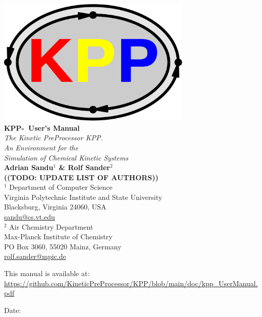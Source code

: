 \documentclass[twoside]{article}
\newcommand{\todo}[1]{{{\color{red}\uppercase{\bf ((TODO: #1))}}}}
\begin{document}
\thispagestyle{empty}
\vspace*{-2cm}
\begin{center}
  {\includegraphics[width=0.7\textwidth]{Figures/kpp-logo}}\\[9mm]
  {\Huge\bf KPP-\thiskppversion\ User's Manual}\\[9mm]
  {\huge\em The Kinetic PreProcessor KPP.}\\[5mm]
  {\huge\em An Environment for the}\\[3mm]
  {\huge\em Simulation of Chemical Kinetic Systems}\\[9mm]
  {\huge\bf Adrian Sandu$^1$ \& Rolf Sander$^2$\\[3mm]\todo{update list of authors}}\\[9mm]
  \Large
  $^1$ Department of Computer Science\\
  Virginia Polytechnic Institute and State University\\
  Blacksburg, Virginia 24060, USA\\
  \url{sandu@cs.vt.edu}\\[5mm]
  $^2$ Air Chemistry Department\\
  Max-Planck Institute of Chemistry\\
  PO Box 3060, 55020 Mainz, Germany\\
  \url{rolf.sander@mpic.de}

  \vfill

  {\large This manual is available at:
    \url{https://github.com/KineticPreProcessor/KPP/blob/main/doc/kpp_UserManual.pdf}}

\end{center}

\begin{center}
  Date: \myfiledate
\end{center}

\newpage\twocolumn

\sloppy
\end{document}
